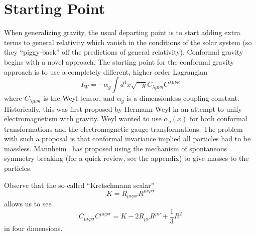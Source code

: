 \section{Starting Point}

When generalizing gravity, the usual departing point is to start adding
extra terms to general relativity which vanish in the conditions of
the solar system (so they ``piggy-back'' off the predictions of
general relativity). Conformal gravity begins with a novel approach.
The starting point for the conformal gravity approach is to use a
completely different, higher order Lagrangian~\cite{Mannheim:1994ph}\cite{Mannheim:2007ki}
\begin{equation}
I_{W} = -\alpha_g\int
d^4x\sqrt{-g}C_{\lambda\mu\nu\kappa}C^{\lambda\mu\nu\kappa}
\end{equation}
where $C_{\lambda\mu\nu\kappa}$ is the Weyl tensor, and $\alpha_g$ is
a dimensionless coupling constant. Historically, this was first
proposed by Hermann Weyl in an attempt to unify electromagnetism with
gravity. Weyl wanted to use $\alpha_{g}(x)$ for both conformal
transformations and the electromagnetic gauge transformations. The
problem with such a proposal is that conformal invariance implied all
particles had to be massless. Mannheim~\cite{Mannheim:1994ph} has
proposed using the mechanism of spontaneous symmetry breaking (for a
quick review, see the appendix) to give masses to the particles.

Observe that the so-called
``Kretschmann scalar''
\begin{equation}
K = R_{\mu\nu\rho\sigma}R^{\mu\nu\rho\sigma}
\end{equation}
allows us to see 
\begin{equation}
C_{\mu\nu\rho\sigma}C^{\mu\nu\rho\sigma} 
= K-
2R_{\mu\nu}R^{\mu\nu}+
\frac{1}{3}R^{2}
\end{equation}
in four dimensions.

